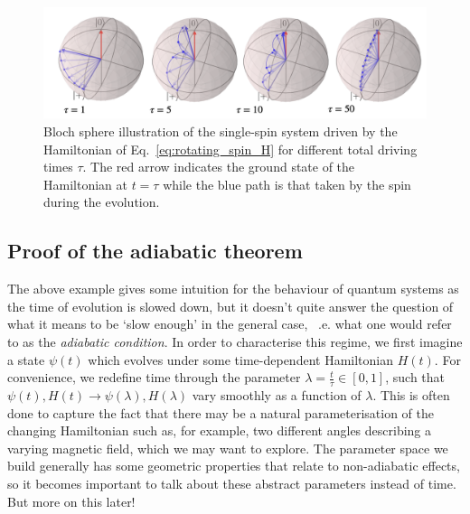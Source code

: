     \begin{figure}[t]
    \centering
    \includegraphics[width=0.9\linewidth]{images/magnetic_field_spin.png} \caption[Rotating spin Bloch sphere illustrations]{Bloch sphere illustration of the single-spin system driven by the Hamiltonian of Eq.~\eqref{eq:rotating_spin_H} for different total driving times $\tau$. The red arrow indicates the ground state of the Hamiltonian at $t = \tau$ while the blue path is that taken by the spin during the evolution.}\label{fig:bloch_rotating_spin}
    \end{figure}

    \subsection{Proof of the adiabatic theorem}\label{sec:2.1.1_proof_adiabatic_theorem}

    The above example gives some intuition for the behaviour of quantum systems as the time of evolution is slowed down, but it doesn't quite answer the question of what it means to be `slow enough' in the general case, ~\@i.e. what one would refer to as the \emph{adiabatic condition}. In order to characterise this regime, we first imagine a state $\psi(t)$ which evolves under some time-dependent Hamiltonian $H(t)$. For convenience, we redefine time through the parameter $\lambda = \frac{t}{\tau} \in [0,1]$, such that $\psi(t), H(t) \rightarrow \psi(\lambda), H(\lambda)$ vary smoothly as a function of $\lambda$. This is often done to capture the fact that there may be a natural parameterisation of the changing Hamiltonian such as, for example, two different angles describing a varying magnetic field, which we may want to explore. The parameter space we build generally has some geometric properties that relate to non-adiabatic effects, so it becomes important to talk about these abstract parameters instead of time. But more on this later!
    
